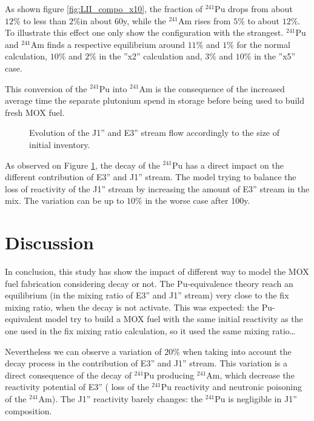\documentclass[10pt]{article}
\begin{document}
As shown figure \ref{fig:LII_compo_x10}, the fraction of $^{241}$Pu drops from
about $12\%$ to less than $2\%$in about 60y, while the $^{241}$Am rises from
$5\%$ to about $12\%$. To illustrate this effect one only show the configuration
with the strangest. $^{241}$Pu and $^{241}$Am finds a respective equilibrium
around $11\%$ and $1\%$ for the normal calculation, $10\%$ and $2\%$ in the
''x2'' calculation and, $3\%$ and $10\%$ in the ''x5'' case. 

This conversion of the $^{241}$Pu into $^{241}$Am is the consequence of the
increased average time the separate plutonium spend in storage before being
used to build fresh MOX fuel.

\begin{figure}[h!]
  \centering
  

  \caption{ Evolution of the J1'' and E3'' stream flow accordingly to the size
    of initial inventory. \label{fig:LII} } 
  \end{figure}

As observed on Figure \ref{fig:LII}, the decay of the $^{241}$Pu has a direct
impact on the different contribution of E3'' and J1'' stream. The model trying
to balance the loss of reactivity of the J1'' stream by increasing the amount of
E3'' stream in the mix. The variation can be up to $10\%$ in the worse case
after 100y.

\section{Discussion}

In conclusion, this study has show the impact of different way to model
the MOX fuel fabrication considering decay or not.
The Pu-equivalence theory reach an equilibrium (in the mixing ratio of E3'' and
J1'' stream) very close to the fix mixing ratio, when the decay is not activate.
This was expected: the Pu-equivalent model try to build a MOX fuel with the same
initial reactivity as the one used in the fix mixing ratio calculation, so it
used the same mixing ratio\dots  

Nevertheless we can observe a variation of $20\%$ when taking into account the
decay process in the contribution of E3'' and J1'' stream. This variation is a
direct consequence of the decay of $^{241}$Pu producing $^{241}$Am, which
decrease the reactivity potential of E3'' ( loss of the $^{241}$Pu reactivity
and neutronic poisoning of the $^{241}$Am). The J1'' reactivity barely changes:
the $^{241}$Pu is negligible in J1'' composition.
\end{document}
